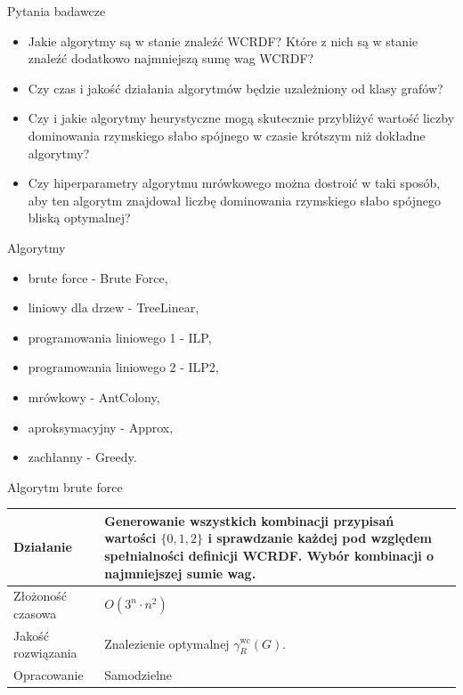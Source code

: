 \documentclass[polish,aspectratio=169]{beamer}
\begin{document}
\begin{frame}{Pytania badawcze}
    \begin{itemize}
        \item Jakie algorytmy są w stanie znaleźć WCRDF? Które z nich są w stanie znaleźć dodatkowo najmniejszą sumę wag WCRDF?
        \item Czy czas i jakość działania algorytmów będzie uzależniony od klasy grafów?
        \item Czy i jakie algorytmy heurystyczne mogą skutecznie przybliżyć wartość liczby dominowania rzymskiego słabo spójnego w czasie krótszym niż dokładne algorytmy?
        \item Czy hiperparametry algorytmu mrówkowego można dostroić w taki sposób, aby ten algorytm znajdował liczbę dominowania rzymskiego słabo spójnego bliską optymalnej?
    \end{itemize}
\end{frame}

\begin{frame}{Algorytmy}
    \begin{itemize}
        \item brute force - Brute Force,
        \item liniowy dla drzew - TreeLinear,
        \item programowania liniowego 1 - ILP,
        \item programowania liniowego 2 - ILP2,
        \item mrówkowy - AntColony,
        \item aproksymacyjny - Approx,
        \item zachłanny - Greedy.
    \end{itemize}
\end{frame}

\begin{frame}{Algorytm brute force}
    \begin{table}
        \centering
        \begin{tabular}{|p{4cm}|p{10cm}|}
        \hline
        Działanie & Generowanie wszystkich kombinacji przypisań wartości $\{0,1,2\}$ i sprawdzanie każdej pod względem spełnialności definicji WCRDF. Wybór kombinacji o najmniejszej sumie wag.  \\
        \hline
        Złożoność czasowa & $O(3^n \cdot n^2)$  \\
        \hline
        Jakość rozwiązania & Znalezienie optymalnej $\gamma^{\mathrm{wc}}_R(G)$.\\
        \hline
        Opracowanie & Samodzielne  \\
        \hline
        \end{tabular}
        \label{tab:brute_force}
    \end{table}
\end{frame}
\end{document}
